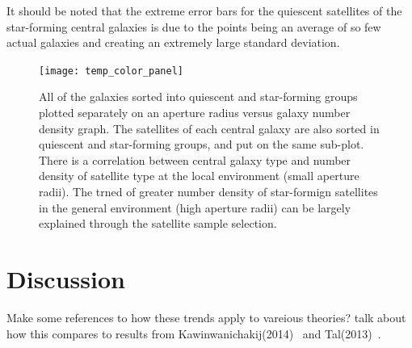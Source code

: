 \documentclass[apj]{emulateapj}
\begin{document}
It should be noted that the extreme error bars for the quiescent satellites of the star-forming central galaxies is due to the points being an average of so few actual galaxies and creating an extremely large standard deviation. 

\begin{figure}
\centering
\graphicspath{{C:/3d_hst/2015_finals/Colors/}}
\texttt{[image: temp\_color\_panel]}
\caption{\footnotesize All of the galaxies sorted into quiescent and star-forming groups plotted separately on an aperture radius versus galaxy number density graph. The satellites of each central galaxy are also sorted in quiescent and star-forming groups, and put on the same sub-plot. There is a correlation between central galaxy type and number density of satellite type at the local environment (small aperture radii). The trned of greater number density of star-formign satellites in the general environment (high aperture radii) can be largely explained through the satellite sample selection.}
\label{fig:color_panel}
\end{figure}

\section{Discussion}

Make some references to how these trends apply to vareious theories? talk about how this compares to results from Kawinwanichakij(2014)~\cite{2014ApJ...792..103K} and Tal(2013)~\cite{2013ApJ...769...31T}.


\acknowledgements

\appendix



\end{document}
